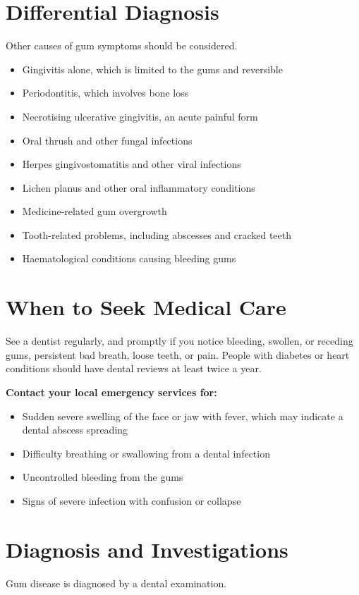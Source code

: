 \section*{Differential Diagnosis}
Other causes of gum symptoms should be considered.

\begin{itemize}
    \item Gingivitis alone, which is limited to the gums and reversible
    \item Periodontitis, which involves bone loss
    \item Necrotising ulcerative gingivitis, an acute painful form
    \item Oral thrush and other fungal infections
    \item Herpes gingivostomatitis and other viral infections
    \item Lichen planus and other oral inflammatory conditions
    \item Medicine-related gum overgrowth
    \item Tooth-related problems, including abscesses and cracked teeth
    \item Haematological conditions causing bleeding gums
\end{itemize}

\section*{When to Seek Medical Care}
See a dentist regularly, and promptly if you notice bleeding, swollen, or receding gums, persistent bad breath, loose teeth, or pain. People with diabetes or heart conditions should have dental reviews at least twice a year.

\textbf{Contact your local emergency services for:}
\begin{itemize}
    \item Sudden severe swelling of the face or jaw with fever, which may indicate a dental abscess spreading
    \item Difficulty breathing or swallowing from a dental infection
    \item Uncontrolled bleeding from the gums
    \item Signs of severe infection with confusion or collapse
\end{itemize}

\section*{Diagnosis and Investigations}
Gum disease is diagnosed by a dental examination.

